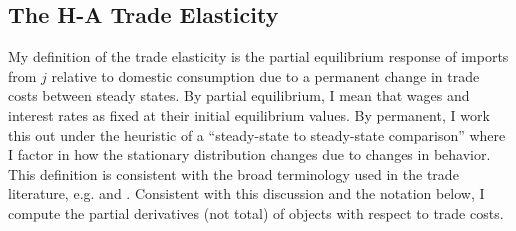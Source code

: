 \documentclass[12pt,pdftex]{article}
\begin{document}
\begin{onehalfspacing}
\newpage


\section{The H-A Trade Elasticity}

My definition of the trade elasticity is the partial equilibrium response of imports from $j$ relative to domestic consumption due to a permanent change in trade costs between steady states. By partial equilibrium, I mean that wages and interest rates as fixed at their initial equilibrium values. By permanent, I work this out under the heuristic of a ``steady-state to steady-state comparison'' where I factor in how the stationary distribution changes due to changes in behavior. This definition is consistent with the broad terminology used in the trade literature, e.g. \citet{arkolakis2012new} and \citet{simonovska2014elasticity}. Consistent with this discussion and the notation below, I compute the partial derivatives (not total) of objects with respect to trade costs.


\end{onehalfspacing}
\end{document}
